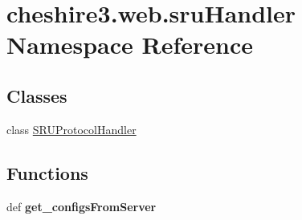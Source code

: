 \hypertarget{namespacecheshire3_1_1web_1_1sru_handler}{\section{cheshire3.\-web.\-sru\-Handler Namespace Reference}
\label{namespacecheshire3_1_1web_1_1sru_handler}
}
\subsection*{Classes}
\begin{DoxyCompactItemize}
\item 
class \hyperlink{classcheshire3_1_1web_1_1sru_handler_1_1_s_r_u_protocol_handler}{S\-R\-U\-Protocol\-Handler}
\end{DoxyCompactItemize}
\subsection*{Functions}
\begin{DoxyCompactItemize}
\item 
\hypertarget{namespacecheshire3_1_1web_1_1sru_handler_a98a147373dc4d1a928878ea1473382c7}{def {\bfseries get\-\_\-configs\-From\-Server}}\label{namespacecheshire3_1_1web_1_1sru_handler_a98a147373dc4d1a928878ea1473382c7}

\end{DoxyCompactItemize}
